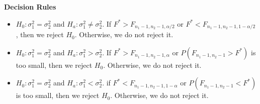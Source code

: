 \textbf{Decision Rules}

\begin{itemize}
	\item $H_0: \sigma_1^2 = \sigma_2^2$ and $H_a:\sigma_1^2 \neq \sigma_2^2$. If $F^* > F_{n_1-1,n_2-1,\alpha/2}$ or $F^* < F_{n_1-1,n_2-1,1 - \alpha/2}$, then we reject $H_0$. Otherwise, we do not reject it.
	\item $H_0: \sigma_1^2 = \sigma_2^2$ and $H_a: \sigma_1^2 > \sigma_2^2$. If $F^*> F_{n_1-1,n_2-1,\alpha}$ or $P(F_{n_1-1,n_2-1} > F^*)$ is too small, then we reject $H_0$. Otherwise, we do not reject it.
	\item $H_0: \sigma_1^2 = \sigma_2^2$ and $H_a: \sigma_1^2 < \sigma_2^2$. if $F^* < F_{n_1-1,n_2-1,1-\alpha}$ or $P(F_{n_1-1,n_2-1} < F^*)$ is too small, then we reject $H_0$. Otherwise, we do not reject it.
\end{itemize}








